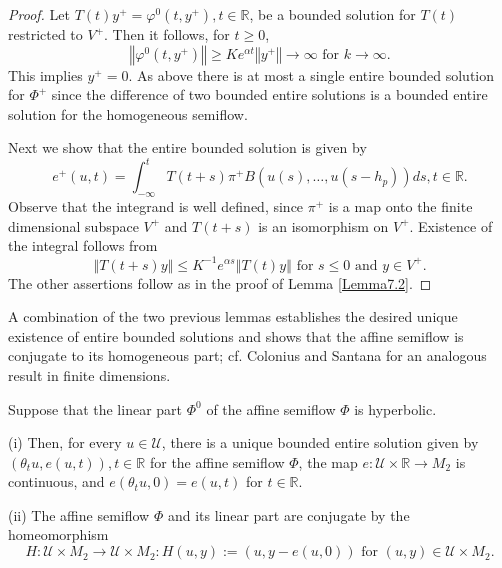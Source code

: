 \documentclass{siamltex}%
\begin{document}
\begin{proof}
Let $T(t)y^{+}=\varphi^{0}(t,y^{+}),t\in\mathbb{R}$, be a bounded solution for
$T(t)$ restricted to $V^{+}$. Then it follows, for $t\geq0$,%
\[
\left\Vert \varphi^{0}(t,y^{+})\right\Vert \geq Ke^{\alpha t}\left\Vert
y^{+}\right\Vert \rightarrow\infty\text{ for }k\rightarrow\infty.
\]
This implies $y^{+}=0$. As above there is at most a single entire bounded
solution for $\Phi^{+}$ since the difference of two bounded entire solutions
is a bounded entire solution for the homogeneous semiflow.

Next we show that the entire bounded solution is given by%
\[
e^{+}(u,t)=\int_{-\infty}^{t}T(t+s)\pi^{+}B(u(s),\ldots,u(s-h_{p}%
))ds,t\in\mathbb{R}.
\]
Observe that the integrand is well defined, since $\pi^{+}$ is a map onto the
finite dimensional subspace $V^{+}$ and $T(t+s)$ is an isomorphism on $V^{+}$.
Existence of the integral follows from%
\[
\left\Vert T(t+s)y\right\Vert \leq K^{-1}e^{\alpha s}\left\Vert
T(t)y\right\Vert \text{ for }s\leq0\text{ and }y\in V^{+}.
\]
The other assertions follow as in the proof of Lemma \ref{Lemma7.2}.
\end{proof}

A combination of the two previous lemmas establishes the desired unique
existence of entire bounded solutions and shows that the affine semiflow is
conjugate to its homogeneous part; cf. Colonius and Santana \cite[Corollary 1
and Theorem 2.5]{ColSan11} for an analogous result in finite dimensions.

\begin{proposition}
\label{Proposition7.3}Suppose that the linear part $\Phi^{0}$ of the affine
semiflow $\Phi$ is hyperbolic.

(i) Then, for every $u\in\mathcal{U}$, there is a unique bounded entire
solution given by $(\theta_{t}u,e(u,t)),\allowbreak t\in\mathbb{R}$ for the
affine semiflow $\Phi$, the map $e:\mathcal{U}\times\mathbb{R}\rightarrow
M_{2}$ is continuous, and $e(\theta_{t}u,0)=e(u,t)$ for $t\in\mathbb{R}$.

(ii) The affine semiflow $\Phi$ and its linear part are conjugate by the
homeomorphism%
\begin{equation}
H:\mathcal{U}\times M_{2}\rightarrow\mathcal{U}\times M_{2}%
:H(u,y):=(u,y-e(u,0))\text{ for }(u,y)\in\mathcal{U}\times M_{2}. \label{H}%
\end{equation}

\end{proposition}
\end{document}
